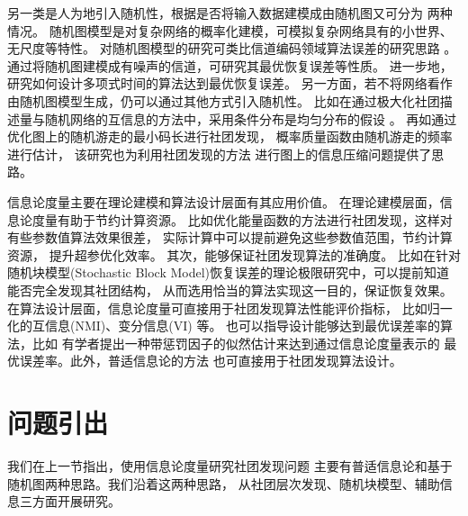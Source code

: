 另一类是人为地引入随机性，根据是否将输入数据建模成由随机图又可分为
两种情况。
随机图模型是对复杂网络的概率化建模，可模拟复杂网络具有的小世界、无尺度等特性。
对随机图模型的研究可类比信道编码领域算法误差的研究思路 \cite{abbe2015community}。
通过将随机图建模成有噪声的信道，可研究其最优恢复误差等性质。
进一步地，研究如何设计多项式时间的算法达到最优恢复误差。
另一方面，若不将网络看作由随机图模型生成，仍可以通过其他方式引入随机性。
比如在通过极大化社团描述量与随机网络的互信息的方法中，采用条件分布是均匀分布的假设
\cite{rosvall2007information}。
再如通过优化图上的随机游走的最小码长进行社团发现，
概率质量函数由随机游走的频率进行估计\cite{rosvall2008mcl}，
该研究也为利用社团发现的方法
进行图上的信息压缩问题提供了思路\cite{abbe17sideinfo}。

信息论度量主要在理论建模和算法设计层面有其应用价值。
在理论建模层面，信息论度量有助于节约计算资源。
比如优化能量函数的方法进行社团发现，这样对有些参数值算法效果很差，
实际计算中可以提前避免这些参数值范围，节约计算资源，
提升超参优化效率\cite{ye2020exact}。
其次，能够保证社团发现算法的准确度。
比如在针对随机块模型(Stochastic Block Model)恢复误差的理论极限研究中，可以提前知道能否完全发现其社团结构，
从而选用恰当的算法实现这一目的，保证恢复效果\cite{abbe2015community}。
在算法设计层面，信息论度量可直接用于社团发现算法性能评价指标，
比如归一化的互信息(NMI)\cite{Danon_2005}、变分信息(VI) \cite{2007Comparing}等。
也可以指导设计能够达到最优误差率的算法，比如
有学者提出一种带惩罚因子的似然估计来达到通过信息论度量表示的
最优误差率\cite{zhang2016}。此外，普适信息论的方法
也可直接用于社团发现算法设计\cite{ic2002, mim, app12094203}。


\section{问题引出}
我们在上一节指出，使用信息论度量研究社团发现问题
主要有普适信息论和基于随机图两种思路。我们沿着这两种思路，
从社团层次发现、随机块模型、辅助信息三方面开展研究。

